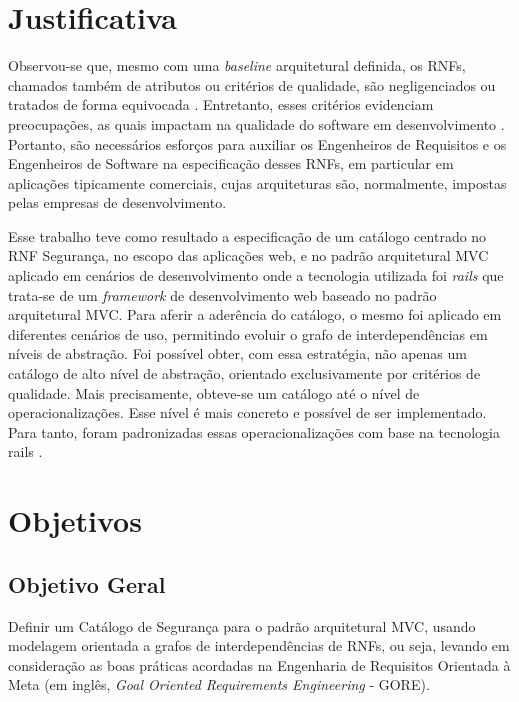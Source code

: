 \section{Justificativa}


Observou-se que, mesmo com uma \textit{baseline}  arquitetural definida, os RNFs, chamados também de atributos ou critérios de qualidade, são negligenciados ou tratados de forma equivocada \cite{eckhardt2016non}. Entretanto, esses critérios evidenciam preocupações, as quais impactam na qualidade do software em desenvolvimento \cite{schneidewind1990standard}.  
Portanto, são necessários esforços para auxiliar os Engenheiros de Requisitos e os Engenheiros de Software na especificação desses RNFs, em particular em aplicações tipicamente comerciais, cujas arquiteturas são, normalmente, impostas pelas empresas de desenvolvimento.

Esse trabalho teve como resultado a especificação de um catálogo centrado no RNF Segurança, no escopo das aplicações web, e no padrão arquitetural MVC aplicado em cenários de desenvolvimento onde a tecnologia utilizada foi \textit{rails} que trata-se de um \textit{framework} de desenvolvimento web baseado no padrão arquitetural MVC. Para aferir a aderência do catálogo, o mesmo foi aplicado em diferentes cenários de uso, permitindo evoluir o grafo de interdependências em níveis de abstração. Foi possível obter, com essa estratégia, não apenas um catálogo de alto nível de abstração, orientado exclusivamente por critérios de qualidade. Mais precisamente, obteve-se um catálogo até o nível de operacionalizações. Esse nível é mais concreto e possível de ser implementado. Para tanto, foram padronizadas essas operacionalizações com base na tecnologia rails \cite{railscommunity}.


\section{Objetivos}
 
\subsection{Objetivo Geral}

Definir um Catálogo de Segurança para o padrão arquitetural MVC, usando modelagem orientada a grafos de interdependências de RNFs, ou seja, levando em consideração as boas práticas acordadas na Engenharia de Requisitos Orientada à Meta (em inglês, \textit{Goal Oriented Requirements Engineering} - GORE). 

